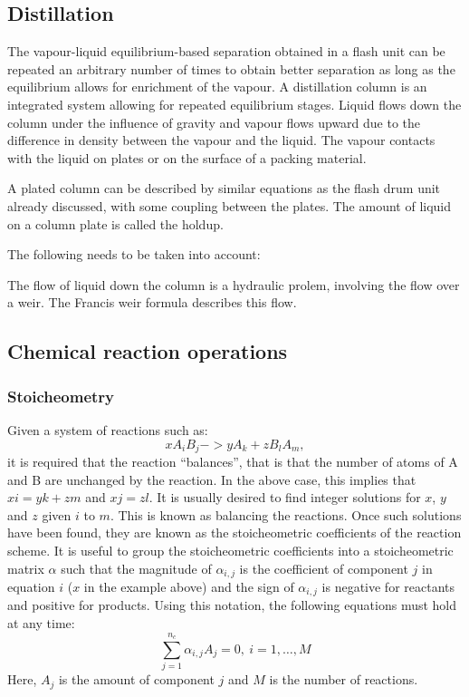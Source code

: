 \subsection{Distillation}

The vapour-liquid equilibrium-based separation obtained in a flash unit can be
repeated an arbitrary number of times to obtain better separation as
long as the equilibrium allows for enrichment of the vapour.  A
distillation column is an integrated system allowing for repeated
equilibrium stages.  Liquid flows down the column under the influence
of gravity and vapour flows upward due to the difference in density
between the vapour and the liquid.  The vapour contacts with the
liquid on plates or on the surface of a packing material.  

A plated column can be described by similar equations as the flash
drum unit already discussed, with some coupling between the plates.
The amount of liquid on a column plate is called the holdup.

The following needs to be taken into account:

The flow of liquid down the column is a hydraulic prolem, involving
the flow over a weir.  The Francis weir formula describes this flow.


\subsection{Chemical reaction operations}

\subsubsection{Stoicheometry}
Given a system of reactions such as:
\begin{equation}
  xA_iB_j -> yA_k + zB_lA_m,
\end{equation}
it is required that the reaction ``balances'', that is that the number
of atoms of A and B are unchanged by the reaction.  In the above case,
this implies that $xi=yk+zm$ and $xj=zl$.  It is usually desired to
find integer solutions for $x$, $y$ and $z$ given $i$ to $m$.  This is
known as balancing the reactions.  Once such solutions have been
found, they are known as the stoicheometric coefficients of the
reaction scheme.  It is useful to group the stoicheometric
coefficients into a stoicheometric matrix $\alpha$ such that the
magnitude of $\alpha_{i,j}$ is the coefficient of component $j$ in
equation $i$ ($x$ in the example above) and the sign of $\alpha_{i,j}$
is negative for reactants and positive for products.  Using this
notation, the following equations must hold at any time:
\begin{equation}
  \sum_{j=1}^{n_c} \alpha_{i,j}A_j = 0,~i=1,\dots,M
\end{equation}
Here, $A_j$ is the amount of component $j$ and $M$ is the  number
of reactions.


